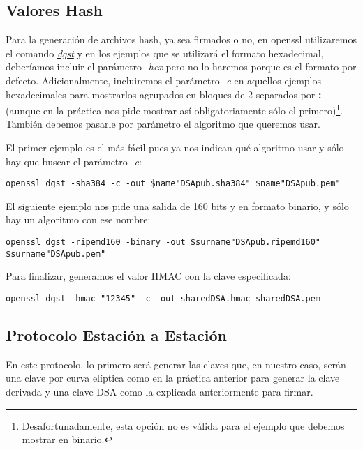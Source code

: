 \documentclass[a4paper, 11pt]{article}
\begin{document}
	\subsection{Valores Hash}
		Para la generación de archivos hash, ya sea firmados o no, en openssl utilizaremos el comando
		\href{https://www.openssl.org/docs/man1.0.2/apps/dgst.html}{\textit{dgst}} y en los ejemplos que se
		utilizará el formato hexadecimal, deberíamos incluir el parámetro \textit{-hex} pero no lo haremos
		porque es el formato por defecto. Adicionalmente, incluiremos el parámetro \textit{-c} en aquellos
		ejemplos hexadecimales para mostrarlos agrupados en bloques de 2 separados por \textbf{:} (aunque en
		la práctica nos pide mostrar así obligatoriamente sólo el primero)\footnote{Desafortunadamente, esta
		opción no es válida para el ejemplo que debemos mostrar en binario.}. También debemos pasarle por
		parámetro el algoritmo que queremos usar.
		
		El primer ejemplo es el más fácil pues ya nos indican qué algoritmo usar y sólo hay que buscar el parámetro
		\textit{-c}:\\
		\begin{small}
			\verb|openssl dgst -sha384 -c -out $name"DSApub.sha384" $name"DSApub.pem"|
		\end{small}
		
		El siguiente ejemplo nos pide una salida de 160 bits y en formato binario, y sólo hay un algoritmo con
		ese nombre:\\
		\begin{small}
			\verb|openssl dgst -ripemd160 -binary -out $surname"DSApub.ripemd160" $surname"DSApub.pem"|
		\end{small}
		
		Para finalizar, generamos el valor HMAC con la clave especificada:\\
		\begin{small}
			\verb|openssl dgst -hmac "12345" -c -out sharedDSA.hmac sharedDSA.pem|
		\end{small}

	\subsection{Protocolo Estación a Estación}
		En este protocolo, lo primero será generar las claves que, en nuestro caso, serán una clave por curva elíptica como
		en la práctica anterior para generar la clave derivada y una clave DSA como la explicada anteriormente para firmar.
		
\end{document}
